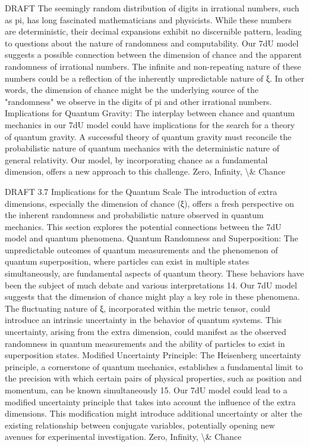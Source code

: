 \documentclass[12pt]{article}
\begin{document}
DRAFT
The seemingly random distribution of digits in irrational numbers, such as pi, has long fascinated
mathematicians and physicists. While these numbers are deterministic, their decimal expansions
exhibit no discernible pattern, leading to questions about the nature of randomness and
computability.
Our 7dU model suggests a possible connection between the dimension of chance and the apparent
randomness of irrational numbers. The inﬁnite and non-repeating nature of these numbers could be
a reﬂection of the inherently unpredictable nature of ξ. In other words, the dimension of chance
might be the underlying source of the "randomness" we observe in the digits of pi and other
irrational numbers.
Implications for Quantum Gravity:
The interplay between chance and quantum mechanics in our 7dU model could have implications
for the search for a theory of quantum gravity. A successful theory of quantum gravity must
reconcile the probabilistic nature of quantum mechanics with the deterministic nature of general
relativity. Our model, by incorporating chance as a fundamental dimension, oﬀers a new approach
to this challenge.
Zero, Infinity, \textbackslash{}& Chance

DRAFT
3.7 Implications for the Quantum Scale
The introduction of extra dimensions, especially the dimension of chance (ξ), oﬀers a fresh
perspective on the inherent randomness and probabilistic nature observed in quantum
mechanics. This section explores the potential connections between the 7dU model and
quantum phenomena.
Quantum Randomness and Superposition:
The unpredictable outcomes of quantum measurements and the phenomenon of quantum
superposition, where particles can exist in multiple states simultaneously, are fundamental
aspects of quantum theory. These behaviors have been the subject of much debate and
various interpretations 14. Our 7dU model suggests that the dimension of chance might
play a key role in these phenomena. The ﬂuctuating nature of ξ, incorporated within the
metric tensor, could introduce an intrinsic uncertainty in the behavior of quantum systems.
This uncertainty, arising from the extra dimension, could manifest as the observed
randomness in quantum measurements and the ability of particles to exist in superposition
states.
Modiﬁed Uncertainty Principle:
The Heisenberg uncertainty principle, a cornerstone of quantum mechanics, establishes a
fundamental limit to the precision with which certain pairs of physical properties, such as
position and momentum, can be known simultaneously 15. Our 7dU model could lead to a
modiﬁed uncertainty principle that takes into account the inﬂuence of the extra dimensions.
This modiﬁcation might introduce additional uncertainty or alter the existing relationship
between conjugate variables, potentially opening new avenues for experimental
investigation.
Zero, Infinity, \textbackslash{}& Chance
\end{document}
